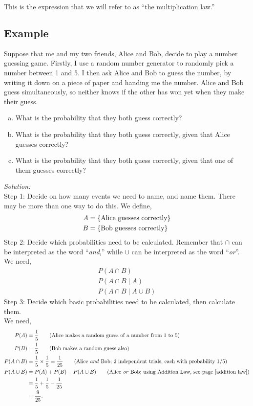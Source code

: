 \noindent This is the expression that we will refer to as ``the multiplication law.''

\subsection{Example}
Suppose that me and my two friends, Alice and Bob, decide to play a number guessing game. Firstly, I use a random number generator to randomly pick a number between 1 and 5. I then ask Alice and Bob to guess the number, by writing it down on a piece of paper and handing me the number. Alice and Bob guess simultaneously, so neither knows if the other has won yet when they make their guess.
\begin{enumerate}[(a)]
\item What is the probability that they both guess correctly?
\item What is the probability that they both guess correctly, given that Alice guesses correctly?
\item What is the probability that they both guess correctly, given that one of them guesses correctly?
\end{enumerate}
\textit{Solution:}  \\
Step 1: Decide on how many events we need to name, and name them. There may be more than one way to do this. We define,
\begin{align*}
A & = \left\{\text{Alice guesses correctly}\right\} \\
B & = \left\{\text{Bob guesses correctly}\right\}
\end{align*}
Step 2: Decide which probabilities need to be calculated. Remember that $\cap$ can be interpreted as the word ``\textit{and},'' while $\cup$ can be interpreted as the word ``\textit{or}''. We need,
\begin{align*}
P(A \cap B) \tag{(a), the probability that they both guess correctly} \\
P(A \cap B \! \mid \! A) \tag{(b), prob both guess correctly given Alice guessed correctly} \\
P(A \cap B \! \mid \! A \cup B) \tag{(c), prob both correct, given one of them is correct}
\end{align*}
Step 3: Decide which basic probabilities need to be calculated, then calculate them. \\
We need,
\begin{align*}
P(A) & = \frac{1}{5} \tag{Alice makes a random guess of a number from 1 to 5} \\
P(B) & = \frac{1}{5} \tag{Bob makes a random guess also} \\
P(A \cap B) & = \frac{1}{5}\times\frac{1}{5} = \frac{1}{25} \tag{Alice \textit{and} Bob; 2 independent trials, each with probability 1/5} \\
P(A \cup B) & = P(A) + P(B) - P(A \cup B) \tag{Alice \textit{or} Bob; using Addition Law, see page \pageref{addition law}} \\
		& = \frac{1}{5} + \frac{1}{5} - \frac{1}{25} \\
		& = \frac{9}{25}.
\end{align*}
